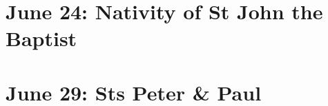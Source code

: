 {{
\bigskip
\benedicamusdomino{}
}

{
\section{June 24: Nativity of St John the Baptist}
\subtitle{ Class}
\subtitle{I \& II Vespers}

\def\definevesperspropers{
  \def\prepsalmfive{\greseteolcustos{manual}}
}
\def\definevesperspropersalt{}
\def\vesperspropersnote{At II Vespers:}
\def\vesperspropersaltnote{At I Vespers:}
\def\prevesperspsalms{\noindent\printnote{Chapter and Hymn of II Vespers, page \pageref{june24-chapter}.\\}}
\def\vesperspsalmslabel{\label{june24-2vespers}}
\def\prevesperspsalmsalt{\noindent\printnote{For II Vespers psalms and antiphons, go to page \pageref{june24-2vespers}.}}
\def\prechapter{\label{june24-chapter}}
\def\premagverses{\greseteolcustos{manual}}

\bigskip
\benedicamusdomino{}
}

{
\section{June 29: Sts Peter \& Paul}
\subtitle{ Class}
\subtitle{I \& II Vespers}

\def\definevesperspropers{
  \def\prepsalmfive{\greseteolcustos{manual}}
}
\def\definevesperspropersalt{}
\def\vesperspropersnote{At II Vespers:}
\def\vesperspropersaltnote{At I Vespers:}
\def\prevesperspsalms{\noindent\printnote{Chapter and Hymn of II Vespers, page \pageref{june29-chapter}.\\}}
\def\vesperspsalmslabel{\label{june29-2vespers}}
\def\prevesperspsalmsalt{\noindent\printnote{For II Vespers psalms and antiphons, go to page \pageref{june29-2vespers}.}}
\def\prechapter{\label{june29-chapter}}
\def\premagverses{\greseteolcustos{manual}}

\def\begincollectcols{\begin{parcolumns}[rulebetween,colwidths={1=0.45\linewidth}]{2}}
\bigskip
\benedicamusdomino{}
}

}
